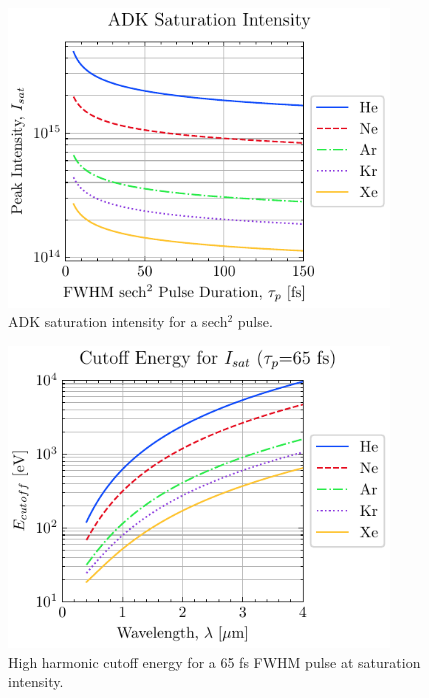 \begin{figure}
	\centering
	\includegraphics[width=0.9\textwidth]{figures/chap1/saturation_intensity.pdf}
	\caption{ADK saturation intensity for a sech$^2$ pulse.}
	\label{fig:saturation_intensity}
\end{figure}

\begin{figure}
	\centering
	\includegraphics[width=0.9\textwidth]{figures/chap1/saturation_intensity_cutoff.pdf}
	\caption{High harmonic cutoff energy for a 65 fs FWHM pulse at saturation intensity.}
	\label{fig:saturation_intensity_cutoff}
\end{figure}

